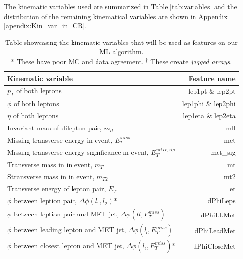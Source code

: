 \documentclass[14pt, a4paper]{book}
\begin{document}
\clearpage\noindent The kinematic variables used are summarized in Table \ref{tab:variables} and the distribution of the remaining kinematical variables are shown in Appendix \ref{apendix:Kin_var_in_CR}.
\begin{table}[!h]
    \centering
    \caption[Kinematic variables used as features]{Table showcasing the kinematic variables that will be used as features on our ML algorithm.\\ * These have poor MC and data agreement. $^\dagger$ These create \textit{jagged arrays}.}
    \begin{tabular}{l|r}\midrule\midrule
        Kinematic variable                                                              & Feature name          \\\midrule
        $p_T$ of both leptons                                                           & lep1pt \& lep2pt      \\
        $\phi$ of both leptons                                                          & lep1phi \& lep2phi    \\
        $\eta$ of both leptons                                                          & lep1eta \& lep2eta    \\
        Invariant mass of dilepton pair, $m_{ll}$                                       & mll \\
        Missing transverse energy in event, $E_T^{miss}$                                & met \\
        Missing transverse energy significance in event, $E_T^{miss,sig}$               & met\_sig \\
        Transverse mass in in event, $m_T$                                              & mt \\
        Stransverse mass in in event, $m_{T2}$                                          & mt2\\
        Transverse energy of lepton pair, $E_T$                                         & et \\
        $\phi$ between leption pair, $\Delta\phi(l_1,l_2)$*                             & dPhiLeps \\
        $\phi$ between leption pair and MET jet, $\Delta\phi(ll,E_T^{miss})$            & dPhiLLMet \\
        $\phi$ between leading lepton and MET jet, $\Delta\phi(l_l,E_T^{miss})$         & dPhiLeadMet \\
        $\phi$ between closest lepton and MET jet, $\Delta\phi(l_c,E_T^{miss})$*        & dPhiCloseMet \\

\end{tabular}
\end{table}
\end{document}
